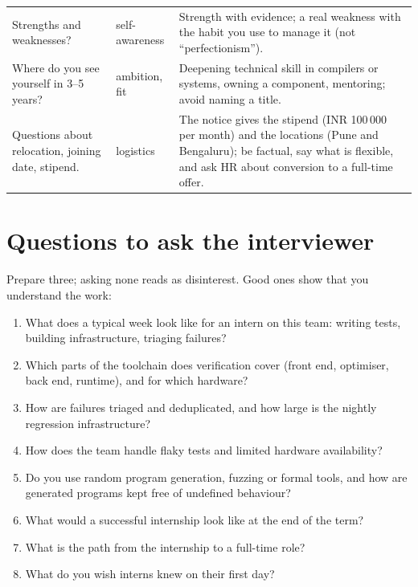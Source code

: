 \documentclass[10pt,a4paper,openany,oneside]{report}
\newcommand{\prio}[1]{\texorpdfstring{\ifcase#1\or{\color{gold}\ding{72}}\or{\color{gold}\ding{72}\ding{72}}\or{\color{gold}\ding{72}\ding{72}\ding{72}}\fi}{}}
\begin{document}
\begin{center}
\begin{xltabular}{\textwidth}{@{}L{3.7cm}L{3.0cm}Y@{}}
Strengths and weaknesses? & self-awareness & Strength with evidence; a real weakness with the habit you use to manage it (not ``perfectionism'').\\
Where do you see yourself in 3--5 years? & ambition, fit & Deepening technical skill in compilers or systems, owning a component, mentoring; avoid naming a title.\\
Questions about relocation, joining date, stipend. & logistics & The notice gives the stipend (INR 100\,000 per month) and the locations (Pune and Bengaluru); be factual, say what is flexible, and ask HR about conversion to a full-time offer.\\
\bottomrule
\end{xltabular}
\end{center}

\section{Questions to ask the interviewer \prio{2}}
Prepare three; asking none reads as disinterest. Good ones show that you understand the work:
\begin{enumerate}[nosep]
\item What does a typical week look like for an intern on this team: writing tests, building infrastructure, triaging failures?
\item Which parts of the toolchain does verification cover (front end, optimiser, back end, runtime), and for which hardware?
\item How are failures triaged and deduplicated, and how large is the nightly regression infrastructure?
\item How does the team handle flaky tests and limited hardware availability?
\item Do you use random program generation, fuzzing or formal tools, and how are generated programs kept free of undefined behaviour?
\item What would a successful internship look like at the end of the term?
\item What is the path from the internship to a full-time role?
\item What do you wish interns knew on their first day?
\end{enumerate}
\end{document}
